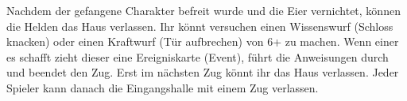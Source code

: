 
Nachdem der gefangene Charakter befreit wurde und die Eier vernichtet, können die Helden das Haus verlassen. Ihr könnt versuchen einen Wissenswurf (Schloss knacken) oder einen
Kraftwurf (Tür aufbrechen) von 6+ zu machen. Wenn einer es schafft zieht dieser eine Ereigniskarte (Event), führt die Anweisungen durch und beendet den Zug. Erst im nächsten Zug könnt ihr das Haus verlassen.
Jeder Spieler kann danach die Eingangshalle mit einem Zug verlassen.



